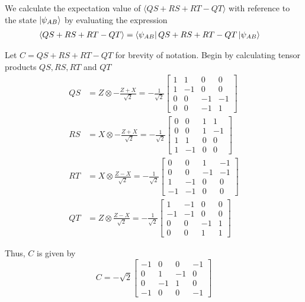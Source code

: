 We calculate the expectation value of $\langle QS + RS + RT - QT \rangle$ with reference to the state $\ket{\psi_{AB}}$ by evaluating the expression
\begin{align*}
	\langle QS + RS + RT - QT \rangle &= \bra{\psi_{AB}} QS + RS + RT - QT \ket{\psi_{AB}}	
\end{align*}

Let $C = QS + RS + RT - QT$ for brevity of notation.
Begin by calculating tensor products $QS, RS, RT$ and $QT$
\begin{align*}
	QS &= Z \otimes -\frac{Z+X}{\sqrt{2}} 
	= -\frac{1}{\sqrt{2}}\begin{bmatrix}
		1	&	1	&	0	&	0	\\
		1	&	-1	&	0	&	0	\\
		0	&	0	&	-1	&	-1	\\
		0	&	0	&	-1	&	1	
	\end{bmatrix} \\
	RS &= X \otimes -\frac{Z+X}{\sqrt{2}} 
	= -\frac{1}{\sqrt{2}}\begin{bmatrix}
		0	&	0	&	1	&	1	\\
		0	&	0	&	1	&	-1	\\
		1	&	1	&	0	&	0	\\
		1	&	-1	&	0	&	0	
	\end{bmatrix} \\
	RT &= X \otimes \frac{Z-X}{\sqrt{2}} 
	= -\frac{1}{\sqrt{2}}\begin{bmatrix}
		0	&	0	&	1	&	-1	\\
		0	&	0	&	-1	&	-1	\\
		1	&	-1	&	0	&	0	\\
		-1	&	-1	&	0	&	0	
	\end{bmatrix} \\
	QT &= Z \otimes \frac{Z-X}{\sqrt{2}} 
	= -\frac{1}{\sqrt{2}}\begin{bmatrix}
		1	&	-1	&	0	&	0	\\
		-1	&	-1	&	0	&	0	\\
		0	&	0	&	-1	&	1	\\
		0	&	0	&	1	&	1	
	\end{bmatrix} 
\end{align*}

Thus, $C$ is given by
\begin{equation*}
	C
	= -\sqrt{2}\begin{bmatrix}
		-1	&	0	&	0	&	-1	\\
		0	&	1	&	-1	&	0	\\
		0	&	-1	&	1	&	0	\\
		-1	&	0	&	0	&	-1	
	\end{bmatrix} 
\end{equation*}

